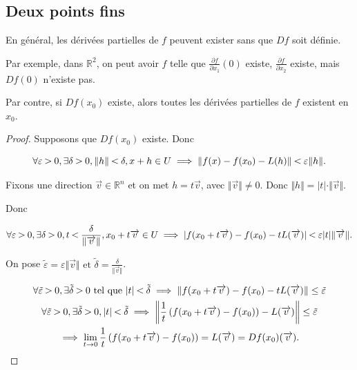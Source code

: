 \documentclass[french]{article}
\newcommand{\lesss}{\rotatebox[origin=c]{90}{$\land$}}
\newcommand{\less}{\ \lesss\ }
\newcommand{\biggg}{\rotatebox[origin=c]{90}{$\lor$}}
\newcommand{\bg}{\ \biggg\ }
\begin{document}
\subsection{Deux points fins}

En général, les dérivées partielles de $f$ peuvent exister sans que $Df$ soit définie.

Par exemple, dans $\mathbb{R}^2$, on peut avoir $f$ telle que $\frac{\partial f }{\partial x_1 }(0) $ existe, $\frac{\partial f }{\partial x_2 } $ existe, mais $Df(0)$ n'existe pas.

Par contre, si $Df(x_0)$ existe, alors toutes les dérivées partielles de $f$ existent en $x_0$.

\begin{proof}
  Supposons que $Df(x_0)$ existe. Donc

  $$ \forall \varepsilon \bg 0, \exists \delta \bg 0, \Vert h \Vert \less \delta , x+h \in U  \implies \Vert f(x) -f(x_0) - L(h) \Vert \less \varepsilon \Vert h \Vert . $$

  Fixons une direction $\overrightarrow{ v } \in \mathbb{R}^n$ et on met $h = t \overrightarrow{ v } $, avec $\Vert \overrightarrow{ v }  \Vert \neq 0$. Donc $\Vert h \Vert = \lvert t \rvert \cdot \Vert \overrightarrow{ v }  \Vert  $.

  Donc

  \begin{gather*}
    \forall \varepsilon \bg 0, \exists \delta  \bg 0, t \less \frac{\delta }{\Vert \overrightarrow{ v }  \Vert}, x_0 + t \overrightarrow{ v }  \in U \implies \lvert f(x_0+t \overrightarrow{ v } )-f(x_0)-tL(\overrightarrow{ v } ) \rvert \less \varepsilon \lvert t \rvert \Vert \overrightarrow{ v }  \Vert .
  \end{gather*}

  On pose $\tilde{\varepsilon } = \varepsilon  \Vert \overrightarrow{ v }  \Vert \text{ et }  \tilde{\delta } = \frac{\delta }{\Vert \overrightarrow{ v }  \Vert } $.

  \begin{gather*}
    \forall \tilde{\varepsilon } \bg 0, \exists \tilde{ \delta } \bg 0 \text{ tel que } \lvert t \rvert \less \tilde{\delta } \implies \Vert f(x_0+t \overrightarrow{ v } ) -f(x_0)-tL(\overrightarrow{ v } ) \Vert   \leq \tilde{\varepsilon } \\
    \forall \tilde{\varepsilon } \bg 0, \exists \tilde{ \delta } \bg 0, \lvert t \rvert \less \tilde{\delta } \implies \left\Vert \frac{1}{t}\left(f(x_0 + t \overrightarrow{ v } ) -f(x_0)) - L(\overrightarrow{ v } \right) \right\Vert \leq \tilde{\varepsilon } \\
    \implies \lim_{t \to 0} \frac{1}{t}\left(f(x_0+t \overrightarrow{ v } )-f(x_0)\right) = L(\overrightarrow{ v } ) = Df(x_0)(\overrightarrow{ v } ) .
  \end{gather*}


\end{proof}
\end{document}
